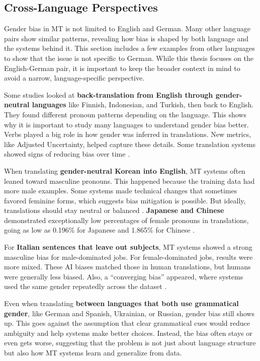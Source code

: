 \subsection{Cross-Language Perspectives}
Gender bias in MT is not limited to English and German. Many other language pairs show similar patterns, revealing how bias is shaped by both language and the systems behind it. This section includes a few examples from other languages to show that the issue is not specific to German. While this thesis focuses on the English-German pair, it is important to keep the broader context in mind to avoid a narrow, language-specific perspective.

Some studies looked at \textbf{back-translation from English through gender-neutral languages} like Finnish, Indonesian, and Turkish, then back to English. They found different pronoun patterns depending on the language. This shows why it is important to study many languages to understand gender bias better. Verbs played a big role in how gender was inferred in translations. New metrics, like Adjusted Uncertainty, helped capture these details. Some translation systems showed signs of reducing bias over time \citep{barclayInvestigatingMarkersDrivers2024a}.

When translating \textbf{gender-neutral Korean into English}, MT systems often leaned toward masculine pronouns. This happened because the training data had more male examples. Some systems made technical changes that sometimes favored feminine forms, which suggests bias mitigation is possible. But ideally, translations should stay neutral or balanced \citep{choMeasuringGenderBias2019}. \textbf{Japanese and Chinese} demonstrated exceptionally low percentages of female pronouns in translations, going as low as 0.196\% for Japanese and 1.865\% for Chinese \citep{pratesAssessingGenderBias2019}.

For \textbf{Italian sentences that leave out subjects}, MT systems showed a strong masculine bias for male-dominated jobs. For female-dominated jobs, results were more mixed. These AI biases matched those in human translations, but humans were generally less biased. Also, a “converging bias” appeared, where systems used the same gender repeatedly across the dataset \citep{smacchiaDoesAIReflect2024}.

Even when translating \textbf{between languages that both use grammatical gender}, like German and Spanish, Ukrainian, or Russian, gender bias still shows up. This goes against the assumption that clear grammatical cues would reduce ambiguity and help systems make better choices. Instead, the bias often stays or even gets worse, suggesting that the problem is not just about language structure but also how MT systems learn and generalize from data.


